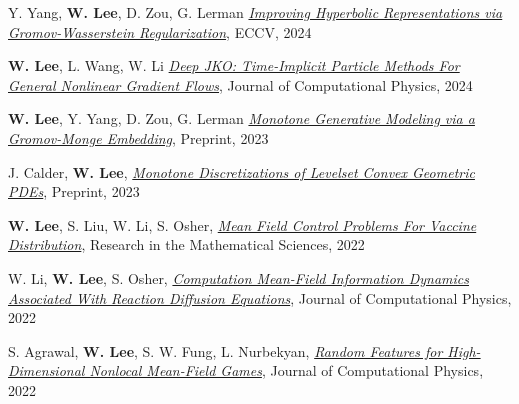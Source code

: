 

\begin{cvparagraph}

\vspace{0.5cm}
\begin{cvitems}
  \item Y. Yang, \textbf{W. Lee}, D. Zou, G. Lerman \href{http://arxiv.org/abs/2407.10495}{\textit{Improving Hyperbolic Representations via Gromov-Wasserstein Regularization}}, ECCV, 2024
    \medskip
  \item \textbf{W. Lee}, L. Wang, W. Li \href{https://arxiv.org/abs/2311.06700}{\textit{Deep JKO: Time-Implicit Particle Methods For General Nonlinear Gradient Flows}}, Journal of Computational Physics, 2024
    \medskip
  \item \textbf{W. Lee}, Y. Yang, D. Zou, G. Lerman \href{https://arxiv.org/abs/2311.01375}{\textit{Monotone Generative Modeling via a Gromov-Monge Embedding}}, Preprint, 2023
    \medskip
  \item J. Calder, \textbf{W. Lee}, \href{https://arxiv.org/abs/2310.08450}{\textit{Monotone Discretizations of Levelset Convex Geometric PDEs}}, Preprint, 2023
    \medskip
  \item \textbf{W. Lee}, S. Liu, W. Li, S. Osher, \href{https://arxiv.org/pdf/2104.11887.pdf}{\textit{Mean Field Control Problems For Vaccine Distribution}}, Research in the Mathematical Sciences, 2022
    \medskip
    \item W. Li, \textbf{W. Lee}, S. Osher, \href{https://arxiv.org/pdf/2107.11501.pdf}{\textit{Computation Mean-Field Information Dynamics Associated With Reaction Diffusion Equations}}, Journal of Computational Physics, 2022
    \medskip
    \item S. Agrawal, \textbf{W. Lee}, S. W. Fung, L. Nurbekyan, \href{https://arxiv.org/abs/2202.12529}{\textit{Random Features for High-Dimensional Nonlocal Mean-Field Games}}, Journal of Computational Physics, 2022

\end{cvitems}
\end{cvparagraph}
